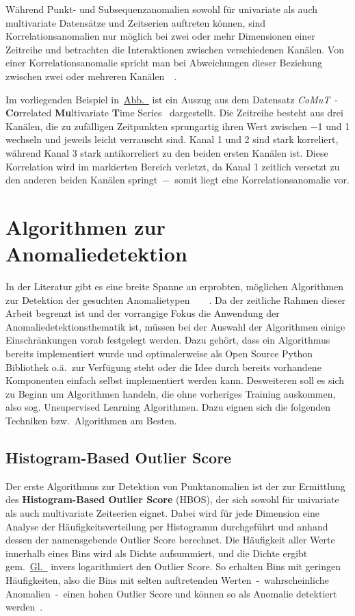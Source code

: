 Während Punkt- und Subsequenzanomalien sowohl für univariate als auch multivariate Datensätze und Zeitserien auftreten können, sind
Korrelationsanomalien nur möglich bei zwei oder mehr Dimensionen einer Zeitreihe und betrachten die Interaktionen zwischen
verschiedenen Kanälen. Von einer Korrelationsanomalie spricht man bei Abweichungen dieser Beziehung zwischen zwei oder mehreren
Kanälen~\cite[S.12-13]{Wenig2024}~\cite{Wenig2024a}.

Im vorliegenden Beispiel in~\hyperref[fig:correlation_Anomaly]{Abb.~} ist ein Auszug aus dem Datensatz
\textit{CoMuT}~- \textbf{Co}rrelated \textbf{Mu}lti\-variate \textbf{T}ime Series~\cite{NaumannCoMuT} dargestellt. Die Zeitreihe besteht
aus drei Kanälen, die zu zufälligen Zeitpunkten sprungartig ihren Wert zwischen $-$1 und 1 wechseln und jeweils leicht verrauscht sind.
Kanal 1 und 2 sind stark korreliert, während Kanal 3 stark antikorreliert zu den beiden ersten Kanälen ist. Diese Korrelation wird im
markierten Bereich verletzt, da Kanal 1 zeitlich versetzt zu den anderen beiden Kanälen springt~$-$~somit liegt eine
Korrelations\-anomalie vor.

\section{Algorithmen zur Anomaliedetektion}
In der Literatur gibt es eine breite Spanne an erprobten, möglichen Algorithmen zur Detektion der gesuchten
Anomalietypen~\cite{Schmidl2022}~\cite{BlazquezGarcia2020}~\cite{Mane2022}~\cite{Wenig2024a}. Da der zeitliche Rahmen dieser Arbeit
begrenzt ist und der vorrangige Fokus die Anwendung der Anomaliedetektionsthematik ist, müssen bei der Auswahl der Algorithmen
einige Einschränkungen vorab festgelegt werden. Dazu gehört, dass ein Algorithmus bereits implementiert wurde und optimalerweise als Open
Source Python Bibliothek o.ä.~zur Verfügung steht oder die Idee durch bereits vorhandene Komponenten einfach selbst implementiert
werden kann. Desweiteren soll es sich zu Beginn um Algorithmen handeln, die ohne vorheriges Training
auskommen, also sog. Unsupervised Learning Algorithmen. Dazu eignen sich die folgenden Techniken bzw.~Algorithmen am Besten.

\subsection{Histogram-Based Outlier Score}
Der erste Algorithmus zur Detektion von Punktanomalien ist der zur Ermittlung des \textbf{Histogram-Based Outlier Score} (HBOS), der sich
sowohl für univariate als auch multivariate Zeitserien eignet. Dabei wird für jede Dimension eine Analyse der Häufigkeitsverteilung per
Histogramm durchgeführt und anhand dessen der namensgebende Outlier Score berechnet. Die Häufigkeit aller Werte innerhalb eines Bins wird als
Dichte aufsummiert, und die Dichte ergibt gem.~\hyperref[eq:hbos]{Gl.~} invers logarithmiert den Outlier Score. So erhalten Bins
mit geringen Häufigkeiten, also die Bins mit selten auftretenden Werten~-~wahrscheinliche Anomalien~-~einen hohen Outlier Score und können
so als Anomalie detektiert werden~\cite{Goldstein2012}.

